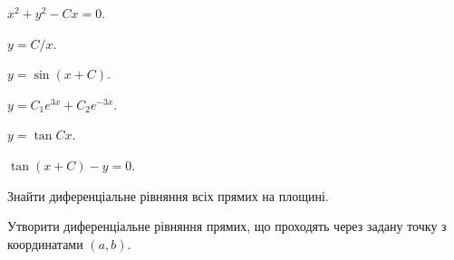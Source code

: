 \begin{problem}
	$x^2 + y^2 - C x = 0$.
\end{problem}

\begin{problem}
	$y = C / x$.
\end{problem}

\begin{problem}
	$y = \sin (x + C)$.
\end{problem}

\begin{problem}
	$y = C_1 e^{3x} + C_2 e^{-3x}$.
\end{problem}

\begin{problem}
	$y = \tan C x$.
\end{problem}

\begin{problem}
	$\tan (x + C) - y = 0$.
\end{problem}

\begin{problem}
	Знайти диференціальне рівняння всіх прямих на площині.
\end{problem}

\begin{problem}
	Утворити диференціальне рівняння прямих, що проходять через задану точку з координатами $(a, b)$.
\end{problem}
